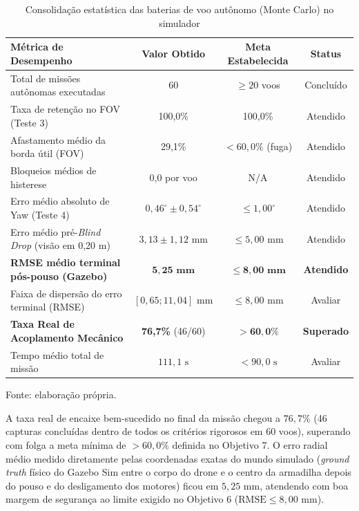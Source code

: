\begin{table}[H]
	\centering
	\footnotesize
	\setlength{\tabcolsep}{4pt}
	\captionsetup{justification=centering}
	\caption{Consolidação estatística das baterias de voo autônomo (Monte Carlo) no simulador}
	\label{tab:consolidado_monte_carlo}
	\vspace{0.2cm}
	\begin{tabular}{>{\raggedright\arraybackslash}p{6.0cm}ccc}
		\hline
		\textbf{Métrica de Desempenho} & \textbf{Valor Obtido} & \textbf{Meta Estabelecida} & \textbf{Status} \\
		\hline
		Total de missões autônomas executadas & 60 & $\ge 20$ voos & Concluído \\
		Taxa de retenção no FOV (Teste 3) & 100,0\% & 100,0\% & Atendido \\
		Afastamento médio da borda útil (FOV) & 29,1\% & $< 60,0\%$ (fuga) & Atendido \\
		Bloqueios médios de histerese & 0,0 por voo & N/A & Atendido \\
		Erro médio absoluto de Yaw (Teste 4) & $0,46^\circ \pm 0,54^\circ$ & $\le 1,00^\circ$ & Atendido \\
		Erro médio pré-\textit{Blind Drop} (visão em 0,20 m) & $3,13 \pm 1,12\text{ mm}$ & $\le 5,00\text{ mm}$ & Atendido \\
		\textbf{RMSE médio terminal pós-pouso (Gazebo)} & $\mathbf{5,25\text{ mm}}$ & $\mathbf{\le 8,00\text{ mm}}$ & \textbf{Atendido} \\
		Faixa de dispersão do erro terminal (RMSE) & $[0,65; 11,04]\text{ mm}$ & $\le 8,00\text{ mm}$ & Avaliar \\
		\textbf{Taxa Real de Acoplamento Mecânico} & \textbf{76,7\%} (46/60) & $\mathbf{> 60,0\%}$ & \textbf{Superado} \\
		Tempo médio total de missão & $111,1\text{ s}$ & $< 90,0\text{ s}$ & Avaliar \\
		\hline
	\end{tabular}
	\vspace{0.2cm}
	\begin{flushleft}
		\footnotesize Fonte: elaboração própria.
	\end{flushleft}
\end{table}

A taxa real de encaixe bem-sucedido no final da missão chegou a $76,7\%$ (46 capturas concluídas dentro de todos os critérios rigorosos em 60 voos), superando com folga a meta mínima de $> 60,0\%$ definida no Objetivo 7. O erro radial médio medido diretamente pelas coordenadas exatas do mundo simulado (\textit{ground truth} físico do Gazebo Sim entre o corpo do drone e o centro da armadilha depois do pouso e do desligamento dos motores) ficou em $5,25\text{ mm}$, atendendo com boa margem de segurança ao limite exigido no Objetivo 6 ($\text{RMSE} \le 8,00\text{ mm}$).

